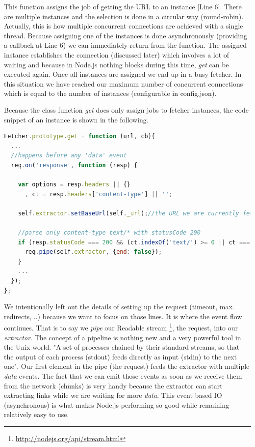 This function assigns the job of getting the URL to an instance [Line 6]. There are multiple instances and the selection is done in a circular way (round-robin). Actually, this is how multiple concurrent connections are achieved with a single thread. Because assigning one of the instances is done asynchronously (providing a callback at Line 6) we can immediately return from the function. The assigned instance establishes the connection (discussed later) which involves a lot of waiting and because in Node.js nothing blocks during this time, \emph{get} can be executed again. Once all instances are assigned we end up in a busy fetcher. In this situation we have reached our maximum number of concurrent connections which is equal to the number of instances (configurable in config.json).

Because the class function \emph{get} does only assign jobs to fetcher instances, the code snippet of an instance is shown in the following.

\begin{lstlisting}[language=JavaScript]
Fetcher.prototype.get = function (url, cb){
  ...
  //happens before any 'data' event
  req.on('response', function (resp) {

    var options = resp.headers || {}
      , ct = resp.headers['content-type'] || '';

    self.extractor.setBaseUrl(self._url);//the URL we are currently fetching

    //parse only content-type text/* with statusCode 200
    if (resp.statusCode === 200 && (ct.indexOf('text/') >= 0 || ct === '')) {
      req.pipe(self.extractor, {end: false});
    }
    ...
  });
};
\end{lstlisting}

We intentionally left out the details of setting up the request (timeout, max. redirects, ..) because we want to focus on those lines. It is where the event flow continues. That is to say we \emph{pipe} our Readable stream \footnote{\url{http://nodejs.org/api/stream.html}}, the request, into our \emph{extractor}. The concept of a pipeline is nothing new and a very powerful tool in the Unix world. "A set of processes chained by their standard streams, so that the output of each process (stdout) feeds directly as input (stdin) to the next one"\cite{wiki:pipeline_unix}. Our first element in the pipe (the request) feeds the extractor with multiple \emph{data} events. The fact that we can emit those events as soon as we receive them from the network (chunks) is very handy because the extractor can start extracting links while we are waiting for more \emph{data}. This event based IO (asynchronous) is what makes Node.js performing so good while remaining relatively easy to use.

